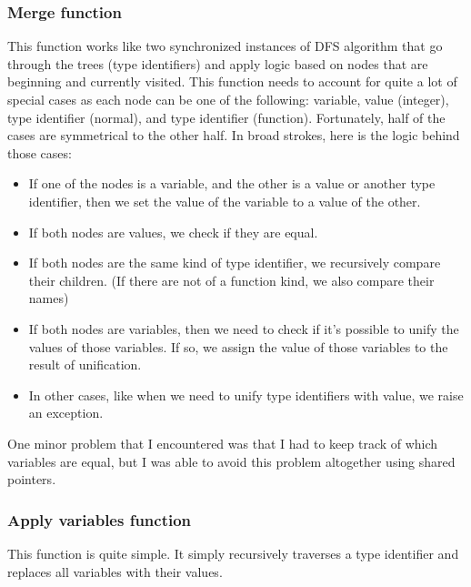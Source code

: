 \documentclass[12pt]{report}
\begin{document}
\subsubsection{Merge function} 
This function works like two synchronized instances of DFS algorithm that go through the trees (type identifiers) and apply logic based on nodes that are beginning and currently visited. 
This function needs to account for quite a lot of special cases as each node can be one of the following: variable, value (integer), type identifier (normal), and type identifier (function). Fortunately, half of the cases are symmetrical to the other half. In broad strokes, here is the logic behind those cases: 
\begin{itemize} 
   \item If one of the nodes is a variable, and the other is a value or another type identifier, then we set the value of the variable to a value of the other. 
   \item If both nodes are values, we check if they are equal. 
   \item If both nodes are the same kind of type identifier, we recursively compare their children. (If there are not of a function kind, we also compare their names) 
   \item If both nodes are variables, then we need to check if it's possible to unify the values of those variables. If so, we assign the value of those variables to the result of unification. 
   \item In other cases, like when we need to unify type identifiers with value, we raise an exception. 
\end{itemize} 
One minor problem that I encountered was that I had to keep track of which variables are equal, but I was able to avoid this problem altogether using shared pointers. 
\subsubsection{Apply variables function} 
This function is quite simple. It simply recursively traverses a type identifier and replaces all variables with their values. 
\end{document}
